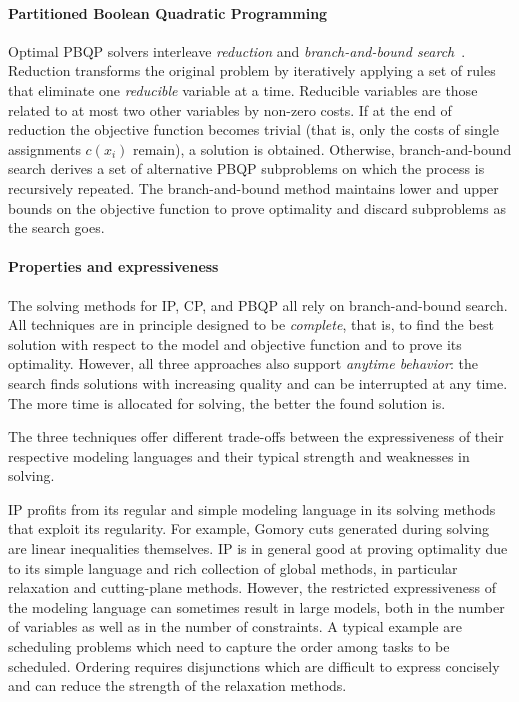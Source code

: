 \documentclass[acmsmall,authorversion,nonacm]{acmart}
\begin{document}
\paragraph{Partitioned Boolean Quadratic Programming}

Optimal PBQP solvers interleave \emph{reduction} and
\emph{branch-and-bound search}~\cite{Hames2006}.
Reduction transforms the original problem by iteratively applying a
set of rules that eliminate one \emph{reducible} variable at a time.
Reducible variables are those related to at most two other variables
by non-zero costs.
If at the end of reduction the objective function becomes trivial
(that is, only the costs of single assignments $c(x_i)$ remain), a
solution is obtained.
Otherwise, branch-and-bound search derives a set of alternative PBQP
subproblems on which the process is recursively repeated.
The branch-and-bound method maintains lower and upper bounds on the
objective function to prove optimality and discard subproblems as the
search goes.

\paragraph{Properties and expressiveness}

The solving methods for IP, CP, and PBQP all rely on branch-and-bound
search. All techniques are in principle designed to be
\emph{complete}, that is, to find the best solution with respect to
the model and objective function and to prove its optimality. However,
all three approaches also support \emph{anytime behavior}: the search
finds solutions with increasing quality and can be interrupted at any
time. The more time is allocated for solving, the better the found
solution is.

The three techniques offer different trade-offs between the
expressiveness of their respective modeling languages and their
typical strength and weaknesses in solving.

IP profits from its regular and simple modeling language in its
solving methods that exploit its regularity. For example, Gomory cuts
generated during solving are linear inequalities themselves. IP is in
general good at proving optimality due to its simple language and rich
collection of global methods, in particular relaxation and
cutting-plane methods. However, the restricted expressiveness of the
modeling language can sometimes result in large models, both in the
number of variables as well as in the number of constraints. A typical
example are scheduling problems which need to capture the order among
tasks to be scheduled. Ordering requires disjunctions which are
difficult to express concisely and can reduce the strength of the
relaxation methods.
\end{document}
